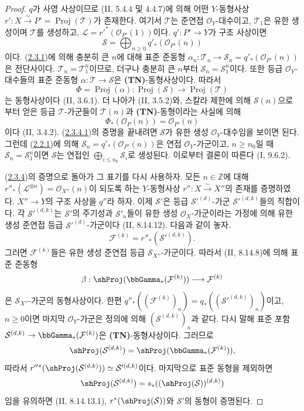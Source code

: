 \begin{proof}
$q$가 사영 사상이므로 (II, 5.4.4 및 4.4.7)에 의해 어떤 $Y$-동형사상
$r':X\xrightarrow{\sim}P'=\operatorname{Proj}(\mathcal T)$가 존재한다.
여기서 $\mathcal T$는 준연접 $\mathcal O_Y$-대수이고,
$\mathcal T_1$은 유한 생성이며 $\mathcal T$를 생성하고,
$\mathcal L=r'^*(\mathcal O_{P'}(1))$이다. $q':P'\to Y$가 구조
사상이면
\[
\mathcal S=\bigoplus_{n\geq0}q'_*(\mathcal O_{P'}(n))
\]
이다. (\hyperref[III.2.3.1-fr]{2.3.1})에 의해 충분히 큰 $n$에 대해
표준 준동형
$\alpha_n:\mathcal T_n\to\mathcal S_n=q'_*(\mathcal O_{P'}(n))$은
전단사이다. $\mathcal T_n=\mathcal T_1^n$이므로, 더구나 충분히 큰
$n$부터 $\mathcal S_n=\mathcal S_1^n$이다. 또한 등급
$\mathcal O_Y$-대수들의 표준 준동형
$\alpha:\mathcal T\to\mathcal S$은 \textbf{(TN)}-동형사상이다.
따라서
\label{III.2.3.5.1-fr}
\[
\Phi=\operatorname{Proj}(\alpha):
\operatorname{Proj}(\mathcal S)\longrightarrow
\operatorname{Proj}(\mathcal T)
\]
는 동형사상이다 (II, 3.6.1). 더 나아가 (II, 3.5.2)와, 스칼라 제한에
의해 $\mathcal S(n)$으로부터 얻은 등급 $\mathcal T$-가군들이
$\mathcal T(n)$과 \textbf{(TN)}-동형이라는 사실에 의해
\[
\Phi_*(\mathcal O_P(n))=\mathcal O_{P'}(n)
\]
이다 (II, 3.4.2). (\hyperref[III.2.3.4.1-fr]{2.3.4.1})의 증명을
끝내려면 $\mathcal S$가 유한 생성 $\mathcal O_Y$-대수임을 보이면
된다. 그런데 (\hyperref[III.2.2.1-fr]{2.2.1})에 의해
$\mathcal S_n=q'_*(\mathcal O_{P'}(n))$은 연접
$\mathcal O_Y$-가군이고, $n\geq n_0$일 때
$\mathcal S_n=\mathcal S_1^n$이면 $\mathcal S$는 연접인
$\bigoplus_{i\leq n_0}\mathcal S_i$로 생성된다. 이로부터 결론이
따른다 (I, 9.6.2).

(\hyperref[III.2.3.4-fr]{2.3.4})의 증명으로 돌아가 그 표기를 다시
사용하자. 모든 $n\in\mathbb Z$에 대해
$r''_*(\mathcal L^{\otimes n})=\mathcal O_{X''}(n)$이 되도록 하는
$Y$-동형사상 $r'':X\xrightarrow{\sim}X''$의 존재를 증명하였다.
$X''\to Y$의 구조 사상을 $q''$라 하자. 이제 $\mathcal S'$은 등급
$\mathcal S'^{(d)}$-가군 $\mathcal S'^{(d,k)}$들의 직합이다. 각
$\mathcal S'^{(d,k)}$는 $\mathcal S'$의 주기성과 $\mathcal S'_n$들이
유한 생성 $\mathcal O_X$-가군이라는 가정에 의해 유한 생성 준연접
등급 $\mathcal S'^{(d)}$-가군이다 (II, 8.14.12). 다음과 같이 놓자.
\[
\mathcal F^{(k)}=r''_*(\mathcal S'^{(d,k)}).
\]
그러면 $\mathcal F^{(k)}$들은 유한 생성 준연접 등급
$\mathcal S_{X''}$-가군이다. 따라서 (II, 8.14.8)에 의해 표준 준동형
\[
\beta:\shProj(\bbGamma_*(\mathcal F^{(k)}))
\longrightarrow\mathcal F^{(k)}
\]
은 $\mathcal S_{X''}$-가군의 동형사상이다. 한편
$q''_*((\mathcal F^{(k)})_n)=q_*((\mathcal S'^{(d,k)})_n)$이고,
$n\geq0$이면 마지막 $\mathcal O_Y$-가군은 정의에 의해
$(\mathcal S^{(d,k)})_n$과 같다. 다시 말해 표준 포함
$\mathcal S^{(d,k)}\to\bbGamma_*(\mathcal F^{(k)})$은
\textbf{(TN)}-동형사상이다. 그러므로
\[
\shProj(\mathcal S^{(d,k)})
=\shProj(\bbGamma_*(\mathcal F^{(k)})),
\]
따라서
$r''{}^*(\shProj(\mathcal S^{(d,k)}))\simeq\mathcal S'^{(d,k)}$이다.
마지막으로 표준 동형을 제외하면
\[
\shProj(\mathcal S^{(d,k)})
=s_*((\shProj(\mathcal S))^{(d,k)})
\]
임을 유의하면 (II, 8.14.13.1), $r^*(\shProj(\mathcal S))$와
$\mathcal S'$의 동형이 증명된다.


\end{proof}
